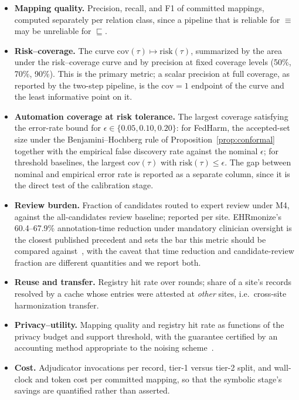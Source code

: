 \documentclass[conference]{IEEEtran}
\begin{document}
\begin{itemize}
\item \textbf{Mapping quality.} Precision, recall, and F1 of committed mappings, computed separately per relation class, since a pipeline that is reliable for $\equiv$ may be unreliable for $\sqsubseteq$.
\item \textbf{Risk--coverage.} The curve $\mathrm{cov}(\tau) \mapsto \mathrm{risk}(\tau)$, summarized by the area under the risk--coverage curve and by precision at fixed coverage levels (50\%, 70\%, 90\%). This is the primary metric; a scalar precision at full coverage, as reported by the two-step pipeline, is the $\mathrm{cov}=1$ endpoint of the curve and the least informative point on it.
\item \textbf{Automation coverage at risk tolerance.} The largest coverage satisfying the error-rate bound for $\epsilon \in \{0.05, 0.10, 0.20\}$: for FedHarm, the accepted-set size under the Benjamini--Hochberg rule of Proposition~\ref{prop:conformal} together with the empirical false discovery rate against the nominal $\epsilon$; for threshold baselines, the largest $\mathrm{cov}(\tau)$ with $\mathrm{risk}(\tau) \le \epsilon$. The gap between nominal and empirical error rate is reported as a separate column, since it is the direct test of the calibration stage.
\item \textbf{Review burden.} Fraction of candidates routed to expert review under M4, against the all-candidates review baseline; reported per site. EHRmonize's 60.4--67.9\% annotation-time reduction under mandatory clinician oversight is the closest published precedent and sets the bar this metric should be compared against~\cite{b40}, with the caveat that time reduction and candidate-review fraction are different quantities and we report both.
\item \textbf{Reuse and transfer.} Registry hit rate over rounds; share of a site's records resolved by a cache whose entries were attested at \emph{other} sites, i.e.\ cross-site harmonization transfer.
\item \textbf{Privacy--utility.} Mapping quality and registry hit rate as functions of the privacy budget and support threshold, with the guarantee certified by an accounting method appropriate to the noising scheme~\cite{b24}.
\item \textbf{Cost.} Adjudicator invocations per record, tier-1 versus tier-2 split, and wall-clock and token cost per committed mapping, so that the symbolic stage's savings are quantified rather than asserted.
\end{itemize}
\end{document}

